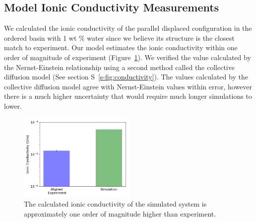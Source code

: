 \documentclass[journal=jpcbfk,manuscript=article]{achemso}
\begin{document}
  \subsection{Model Ionic Conductivity Measurements}
 

  
  
  
  We calculated the ionic conductivity of the parallel displaced configuration in
  the ordered basin with 1 wt \% water since we believe its structure is the 
  closest match to experiment. Our model estimates the ionic conductivity within
  one order of magnitude of experiment (Figure~\ref{fig:ionic_conductivity}). We
  verified the value calculated by the Nernst-Einstein relationship using a 
  second method called the collective diffusion model\cite{liu_collective_2013} 
  (See section S~\ref{s-fig:conductivity}). The values calculated by the 
  collective diffusion model agree with Nernst-Einstein  values within error, 
  however there is a much higher uncertainty that would require much longer 
  simulations to lower.
  

  \begin{figure}
  \centering
  \includegraphics[width=0.5\textwidth]{IC_nernst.png}
  \caption{The calculated ionic conductivity of the simulated system is approximately
  one order of magnitude higher than experiment.}\label{fig:ionic_conductivity}
  \end{figure}
\end{document}

